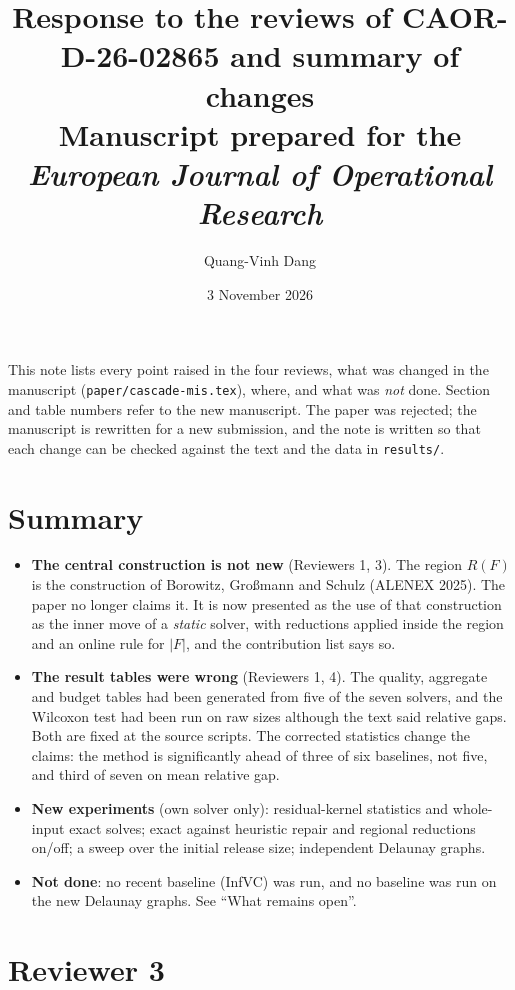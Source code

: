 \documentclass[11pt]{article}
\title{Response to the reviews of CAOR-D-26-02865 and summary of changes\\
\large Manuscript prepared for the \emph{European Journal of Operational Research}}
\author{Quang-Vinh Dang}
\date{3 November 2026}
\begin{document}
\maketitle

This note lists every point raised in the four reviews, what was changed in the
manuscript (\texttt{paper/cascade-mis.tex}), where, and what was \emph{not}
done. Section and table numbers refer to the new manuscript. The paper was
rejected; the manuscript is rewritten for a new submission, and the note is
written so that each change can be checked against the text and the data in
\texttt{results/}.

\section*{Summary}
\begin{itemize}
\item \textbf{The central construction is not new} (Reviewers 1, 3). The region
  $R(F)$ is the construction of Borowitz, Gro{\ss}mann and Schulz (ALENEX 2025). The
  paper no longer claims it. It is now presented as the use of that construction
  as the inner move of a \emph{static} solver, with reductions applied inside the
  region and an online rule for $|F|$, and the contribution list says so.
\item \textbf{The result tables were wrong} (Reviewers 1, 4). The quality,
  aggregate and budget tables had been generated from five of the seven solvers,
  and the Wilcoxon test had been run on raw sizes although the text said relative
  gaps. Both are fixed at the source scripts. The corrected statistics change the
  claims: the method is significantly ahead of three of six baselines, not five,
  and third of seven on mean relative gap.
\item \textbf{New experiments} (own solver only): residual-kernel statistics and
  whole-input exact solves; exact against heuristic repair and regional
  reductions on/off; a sweep over the initial release size; independent Delaunay
  graphs.
\item \textbf{Not done}: no recent baseline (InfVC) was run, and no baseline was run
  on the new Delaunay graphs. See ``What remains open''.
\end{itemize}

\section*{Reviewer 3}
\end{document}
